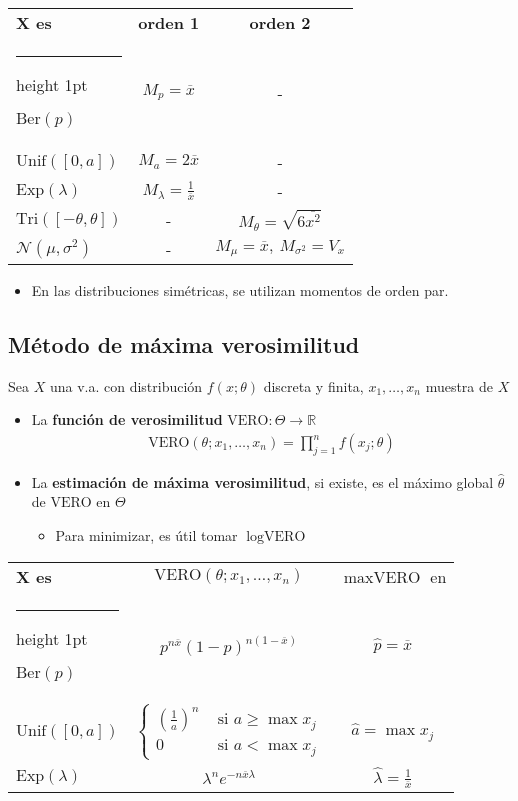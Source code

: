 \documentclass[a4paper,twocolumn]{extarticle}
\makeatletter
\theoremstyle{remark}
\newcommand{\R}{\mathbb{R}}
\newcommand{\xbarra}{\overline{x}}
\newcommand{\normal}{\mathcal{N}}
\newcommand{\vero}{\text{VERO}}
\newcommand{\thickhline}{%
	\noalign {\ifnum 0=`}\fi \hrule height 1pt
	\futurelet \reserved@a \@xhline
}
\makeatother
\begin{document}
\begin{table}[h]
	\centering
	{\renewcommand{\arraystretch}{1.4}
	\begin{tabular}{|l|c|c|}
		\hline
		\textbf{X es} & \textbf{orden 1} & \textbf{orden 2} \\\thickhline
		$\text{Ber}(p)$ & $M_p = \xbarra$ & - \\\hline
		$\text{Unif}([0,a])$ & $M_a = 2\xbarra$ & -\\\hline
		$\text{Exp}(\lambda)$ & $M_\lambda = \frac{1}{\xbarra}$ & - \\\hline
		$\text{Tri}([-\theta, \theta])$ & - & $M_\theta = \sqrt{6\overline{x^2}}$\\\hline
		$\normal(\mu, \sigma^2)$ & - & $M_\mu = \xbarra,\ M_{\sigma^2} = V_x$ \\\hline
	\end{tabular}}
\end{table}
\begin{itemize}
	\item En las distribuciones simétricas, se utilizan momentos de orden par.
\end{itemize}

\subsection{Método de máxima verosimilitud}
Sea $X$ una v.a. con distribución $f(x; \theta)$ discreta y finita, $x_1, \dots, x_n$ muestra de $X$
\begin{itemize}
	\item La \textbf{función de verosimilitud} $\vero: \Theta \to \R$
	\begin{align*}
		\vero(\theta; x_1, \dots, x_n) = \prod_{j=1}^{n} f(x_j; \theta)
	\end{align*}
	\item La \textbf{estimación de máxima verosimilitud}, si existe, es el máximo global $\widehat{\theta}$ de $\vero$ en $\Theta$
	\begin{itemize}
		\item Para minimizar, es útil tomar $\log \vero$
	\end{itemize}
\end{itemize}

\begin{table}[h]
	\centering
	{\renewcommand{\arraystretch}{1.4}
		\begin{tabular}{|l|c|c|}
			\hline
			\textbf{X es} & $\vero(\theta; x_1, \dots, x_n)$ & $\max \vero$ en \\\thickhline
			$\text{Ber}(p)$ & $p^{n\xbarra}(1-p)^{n(1-\xbarra)}$ & $\widehat{p} = \xbarra$ \\\hline
			$\text{Unif}([0,a])$ & $\begin{cases}
			\left(\frac{1}{a}\right)^n &\text{ si } a \geq \max x_j \\
			0 & \text{ si } a < \max x_j
			\end{cases}$ & $\widehat{a} = \max x_j$ \\\hline
			$\text{Exp}(\lambda)$ & $\lambda^ne^{-n\xbarra\lambda}$ & $\widehat{\lambda} = \frac{1}{\xbarra}$ \\\hline
	\end{tabular}}
\end{table}
\end{document}
